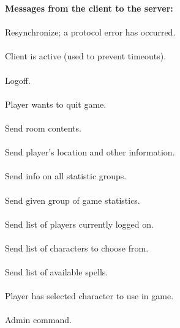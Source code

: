 \begin{protocol}
{\bf Messages from the client to the server:} \\

 \\
Resynchronize; a protocol error has occurred. \\

 \\
Client is active (used to prevent timeouts). \\

 \\
Logoff. \\

 \\
Player wants to quit game. \\

 \\
Send room contents. \\

 \\
Send player's location and other information. \\

 \\
Send info on all statistic groups. \\

  \\
Send given group of game statistics. \\

 \\
Send list of players currently logged on. \\

 \\
Send list of characters to choose from. \\

 \\
Send list of available spells. \\

  \\
Player has selected character to use in game. \\

  \\
Admin command. \\


\end{protocol}
